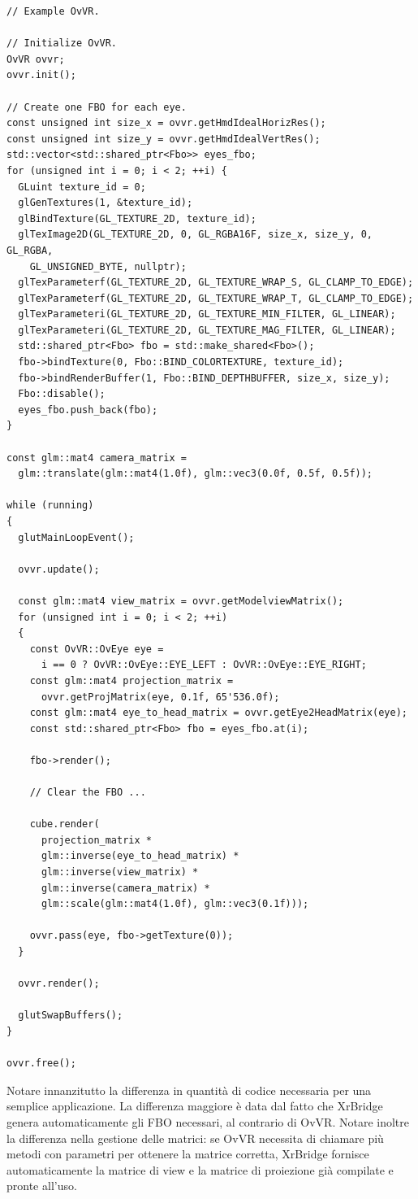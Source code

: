 \documentclass[twoside]{supsistudent}
\begin{document}
\begin{verbatim}
// Example OvVR.

// Initialize OvVR.
OvVR ovvr;
ovvr.init();

// Create one FBO for each eye.
const unsigned int size_x = ovvr.getHmdIdealHorizRes();
const unsigned int size_y = ovvr.getHmdIdealVertRes();
std::vector<std::shared_ptr<Fbo>> eyes_fbo;
for (unsigned int i = 0; i < 2; ++i) {
  GLuint texture_id = 0;
  glGenTextures(1, &texture_id);
  glBindTexture(GL_TEXTURE_2D, texture_id);
  glTexImage2D(GL_TEXTURE_2D, 0, GL_RGBA16F, size_x, size_y, 0, GL_RGBA,
    GL_UNSIGNED_BYTE, nullptr);
  glTexParameterf(GL_TEXTURE_2D, GL_TEXTURE_WRAP_S, GL_CLAMP_TO_EDGE);
  glTexParameterf(GL_TEXTURE_2D, GL_TEXTURE_WRAP_T, GL_CLAMP_TO_EDGE);
  glTexParameteri(GL_TEXTURE_2D, GL_TEXTURE_MIN_FILTER, GL_LINEAR);
  glTexParameteri(GL_TEXTURE_2D, GL_TEXTURE_MAG_FILTER, GL_LINEAR);
  std::shared_ptr<Fbo> fbo = std::make_shared<Fbo>();
  fbo->bindTexture(0, Fbo::BIND_COLORTEXTURE, texture_id);
  fbo->bindRenderBuffer(1, Fbo::BIND_DEPTHBUFFER, size_x, size_y);
  Fbo::disable();
  eyes_fbo.push_back(fbo);
}

const glm::mat4 camera_matrix =
  glm::translate(glm::mat4(1.0f), glm::vec3(0.0f, 0.5f, 0.5f));

while (running)
{
  glutMainLoopEvent();

  ovvr.update();

  const glm::mat4 view_matrix = ovvr.getModelviewMatrix();
  for (unsigned int i = 0; i < 2; ++i)
  {
    const OvVR::OvEye eye =
      i == 0 ? OvVR::OvEye::EYE_LEFT : OvVR::OvEye::EYE_RIGHT;
    const glm::mat4 projection_matrix =
      ovvr.getProjMatrix(eye, 0.1f, 65'536.0f);
    const glm::mat4 eye_to_head_matrix = ovvr.getEye2HeadMatrix(eye);
    const std::shared_ptr<Fbo> fbo = eyes_fbo.at(i);

    fbo->render();

    // Clear the FBO ...

    cube.render(
      projection_matrix *
      glm::inverse(eye_to_head_matrix) *
      glm::inverse(view_matrix) *
      glm::inverse(camera_matrix) *
      glm::scale(glm::mat4(1.0f), glm::vec3(0.1f)));

    ovvr.pass(eye, fbo->getTexture(0));
  }

  ovvr.render();

  glutSwapBuffers();
}

ovvr.free();
\end{verbatim}

Notare innanzitutto la differenza in quantità di codice necessaria per una semplice applicazione. La differenza maggiore è data dal fatto che XrBridge genera automaticamente gli FBO necessari, al contrario di OvVR. Notare inoltre la differenza nella gestione delle matrici: se OvVR necessita di chiamare più metodi con parametri per ottenere la matrice corretta, XrBridge fornisce automaticamente la matrice di view e la matrice di proiezione già compilate e pronte all'uso.
\end{document}
